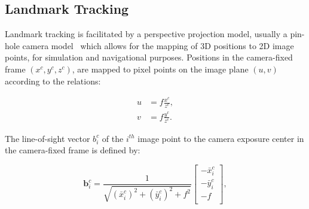






\subsection{Landmark Tracking}

Landmark tracking is facilitated by a perspective projection model, usually a
pin-hole camera model~\cite{Shuang2008} which allows for the mapping of 3D
positions to 2D image points, for simulation and navigational purposes.
Positions in the camera-fixed frame $(x^c, y^c, z^c)$, are mapped to pixel
points on the image plane $(u,v)$ according to the relations:

\begin{equation}
    \begin{aligned}
        u&=f\frac{x^c}{z^c},\\
        v&=f\frac{y^c}{z^c}.
    \end{aligned}
\end{equation}

The line-of-sight vector $b_i^c$ of the $i^{th}$ image point to the camera
exposure center in the camera-fixed frame is defined by:

\begin{equation}
    \mathbf{b}_i^c=\frac{1}{\sqrt{(\bar{x}_i^c)^2+(\bar{y}_i^c)^2+f^2}}
    \begin{bmatrix}
    -\bar{x}^c_i \\
    -\bar{y}^c_i \\
    -f \\
    \end{bmatrix},
\end{equation}

